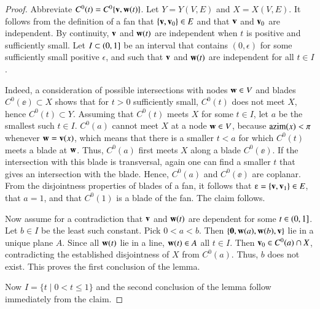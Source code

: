 \begin{proof}
Abbreviate $C^0(t) = C^0\{{\mathbf v},{\mathbf w}(t)\}$.
Let $Y = Y(V,E)$ and $X = X(V,E)$.
It follows from the definition of a fan that $\{{\mathbf v},{\mathbf v}_0\}\in E$ and
that ${\mathbf v}$ and ${\mathbf v}_0$ are independent.  By continuity, ${\mathbf v}$ and ${\mathbf w}(t)$
are independent when $t$ is positive and sufficiently small.  
Let $I\subset(0,1]$ be an interval that contains $(0,\epsilon)$ for some sufficiently small positive $\epsilon$, and such that ${\mathbf v}$ and ${\mathbf w}(t)$ are independent for all $t\in I$.

Indeed,  a consideration of possible intersections with nodes ${\mathbf w}\in V$ and blades
$C^0(\ee)\subset X$ shows that for $t>0$ sufficiently small,
$C^0(t)$ does not meet $X$, hence $C^0(t)\subset Y$.  Assuming 
that $C^0(t)$ meets $X$ for some $t\in I$, let $a$
be the smallest such $t\in I$.
$C^0(a)$ cannot meet $X$ at a node ${\mathbf w}\in V$, because ${\operatorname{azim}}(x)<\pi$ whenever ${\mathbf w}={\mathbf v}(x)$, 
which means that 
there is a smaller $t<a$ for which $C^0(t)$ meets a blade at ${\mathbf w}$.
Thus, $C^0(a)$ first meets $X$ along a blade $C^0(\ee)$. If
the intersection with this blade is transversal, again one can find a smaller $t$ that
gives an intersection with the blade.  Hence, 
$C^0(a)$ and $C^0(\ee)$ are coplanar.  From the disjointness
properties of blades of a fan, it follows that $\ee = \{\v,\v_1\}\in E$,
that $a=1$, and that $C^0(1)$ is a blade of the fan.  The claim follows.

Now assume for a contradiction that ${\mathbf v}$ and ${\mathbf w}(t)$ are dependent for some $t\in(0,1]$.  Let $b\in I$ be the least such constant.  
Pick $0<a<b$.  Then
$\{{\mathbf 0},{\mathbf w}(a),{\mathbf w}(b),{\mathbf v}\}$ lie in a unique plane $A$.  Since all ${\mathbf w}(t)$
lie in a line,  ${\mathbf w}(t)\in A$ all $t\in I$.  Then ${\mathbf v}_0\in C^0(a)\cap X$,
contradicting the established disjointness of $X$ from $C^0(a)$.  Thus, $b$ does not exist.  This proves the first conclusion of the lemma.  

Now $I= \{t\mid 0 < t \le 1\}$ and the second conclusion of the lemma follow immediately from the claim.
\end{proof}

